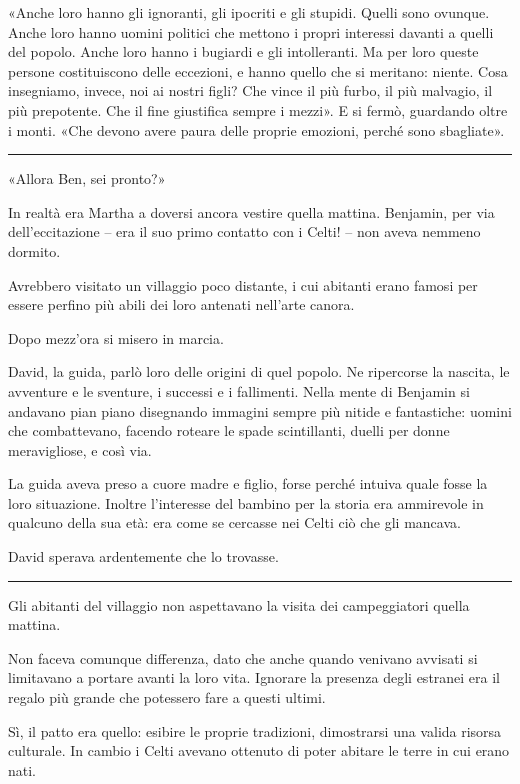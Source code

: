 «Anche loro hanno gli ignoranti, gli ipocriti e gli stupidi. Quelli sono ovunque. Anche loro hanno
uomini politici che mettono i propri interessi davanti a quelli del popolo. Anche loro hanno i
bugiardi e gli intolleranti. Ma per loro queste persone costituiscono delle eccezioni, e hanno
quello che si meritano: niente. Cosa insegniamo, invece, noi ai nostri figli? Che vince il più
furbo, il più malvagio, il più prepotente. Che il fine giustifica sempre i mezzi». E si fermò,
guardando oltre i monti. «Che devono avere paura delle proprie emozioni, perché sono sbagliate».

\plainbreak{1}

«Allora Ben, sei pronto?»

In realtà era Martha a doversi ancora vestire quella mattina. Benjamin, per via dell'eccitazione --
era il suo primo contatto con i Celti! -- non aveva nemmeno dormito.

Avrebbero visitato un villaggio poco distante, i cui abitanti erano famosi per essere perfino più
abili dei loro antenati nell'arte canora.

Dopo mezz'ora si misero in marcia.

David, la guida, parlò loro delle origini di quel popolo. Ne ripercorse la nascita, le avventure e
le sventure, i successi e i fallimenti. Nella mente di Benjamin si andavano pian piano disegnando
immagini sempre più nitide e fantastiche: uomini che combattevano, facendo roteare le spade
scintillanti, duelli per donne meravigliose, e così via.

La guida aveva preso a cuore madre e figlio, forse perché intuiva quale fosse la loro situazione.
Inoltre l'interesse del bambino per la storia era ammirevole in qualcuno della sua età: era come se
cercasse nei Celti ciò che gli mancava.

David sperava ardentemente che lo trovasse.

\plainbreak{1}

Gli abitanti del villaggio non aspettavano la visita dei campeggiatori quella mattina.

Non faceva comunque differenza, dato che anche quando venivano avvisati si limitavano a portare
avanti la loro vita. Ignorare la presenza degli estranei era il regalo più grande che potessero fare
a questi ultimi.

Sì, il patto era quello: esibire le proprie tradizioni, dimostrarsi una valida risorsa culturale. In
cambio i Celti avevano ottenuto di poter abitare le terre in cui erano nati.

